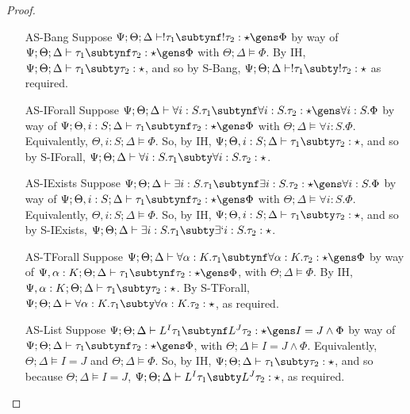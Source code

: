 \begin{proof}
\begin{itemize}
  \item[AS-Bang] Suppose $\Psi ; \Theta ; \Delta \vdash !\tau_1 \subtynf !\tau_2 : \star \gens \Phi$ by way of $\Psi ; \Theta ; \Delta \vdash \tau_1 \subtynf \tau_2 : \star \gens \Phi$ with $\Theta ; \Delta \vDash \Phi$. By IH, $\Psi ; \Theta ; \Delta \vdash \tau_1 \subty \tau_2 : \star$, and so by S-Bang, $\Psi ; \Theta ; \Delta \vdash !\tau_1 \subty !\tau_2 : \star$ as required.
  \item[AS-IForall] Suppose $\Psi ; \Theta ; \Delta \vdash \forall i : S. \tau_1 \subtynf \forall i : S. \tau_2 : \star \gens \forall i : S. \Phi$ by way of $\Psi ; \Theta, i : S ; \Delta \vdash \tau_1 \subtynf \tau_2 : \star \gens \Phi$ with $\Theta ; \Delta \vDash \forall i : S. \Phi$. Equivalently, $\Theta, i : S; \Delta \vDash \Phi$. So, by IH, $\Psi ; \Theta, i : S ; \Delta \vdash \tau_1 \subty \tau_2 : \star$, and so by S-IForall, $\Psi ; \Theta ; \Delta \vdash \forall i : S. \tau_1 \subty \forall i : S. \tau_2 : \star$.
  \item[AS-IExists] Suppose $\Psi ; \Theta ; \Delta \vdash \exists i : S. \tau_1 \subtynf \exists i : S. \tau_2 : \star \gens \forall i : S. \Phi$ by way of $\Psi ; \Theta, i : S ; \Delta \vdash \tau_1 \subtynf \tau_2 : \star \gens \Phi$ with $\Theta ; \Delta \vDash \forall i : S. \Phi$. Equivalently, $\Theta, i : S; \Delta \vDash \Phi$. So, by IH, $\Psi ; \Theta, i : S ; \Delta \vdash \tau_1 \subty \tau_2 : \star$, and so by S-IExists, $\Psi ; \Theta ; \Delta \vdash \exists i : S. \tau_1 \subty \exists` i : S. \tau_2 : \star$.
  \item[AS-TForall] Suppose $\Psi ; \Theta ; \Delta \vdash \forall \alpha : K. \tau_1 \subtynf \forall \alpha : K. \tau_2 : \star \gens \Phi$ by way of $\Psi, \alpha : K ; \Theta ; \Delta \vdash \tau_1 \subtynf \tau_2 : \star \gens \Phi$, with $\Theta ; \Delta \vDash \Phi$. By IH, $\Psi, \alpha : K ; \Theta ; \Delta \vdash \tau_1 \subty \tau_2 : \star$. By S-TForall, $\Psi ; \Theta ; \Delta \vdash \forall \alpha : K. \tau_1 \subty \forall \alpha : K. \tau_2 : \star$, as required.
  \item[AS-List] Suppose $\Psi ; \Theta ; \Delta \vdash L^I \tau_1 \subtynf L^J \tau_2 : \star \gens I = J \wedge \Phi$ by way of $\Psi ; \Theta ; \Delta \vdash \tau_1 \subtynf \tau_2 : \star \gens \Phi$, with $\Theta ; \Delta \vDash I = J \wedge \Phi$. Equivalently, $\Theta ; \Delta \vDash I = J$ and $\Theta ; \Delta \vDash \Phi$. So, by IH, $\Psi ; \Theta ; \Delta \vdash \tau_1 \subty \tau_2 : \star$, and so because $\Theta ; \Delta \vDash I = J$, $\Psi ; \Theta ; \Delta \vdash L^I \tau_1 \subty L^J \tau_2 : \star$, as required.

\end{itemize}
\end{proof}
